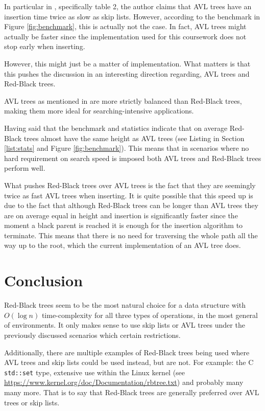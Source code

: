 \documentclass[article]{uom-coursework}
\def\CC{{C\nolinebreak\raisebox{.25ex}{\scriptsize\bfseries{++}}}}
\begin{document}
In particular in \textcite{pugh90}, specifically table 2, the
author claims that AVL trees have an insertion time twice as
slow as skip lists. However, according to the benchmark in
Figure \ref{fig:benchmark}, this is actually not the case. In
fact, AVL trees might actually be faster since the
implementation used for this coursework does not stop early when
inserting.

However, this might just be a matter of implementation. What
matters is that this pushes the discussion in an interesting
direction regarding, AVL trees and Red-Black trees.

AVL trees as mentioned in \textcite{wikiavltree} are
more strictly balanced than Red-Black trees, making
them more ideal for searching-intensive applications.

Having said that the benchmark and statistics indicate that on
average Red-Black trees almost have the same height as AVL trees
(see Listing in Section \ref{list:stats} and Figure
\ref{fig:benchmark}). This means that in scenarios
where no hard requirement on search speed is imposed
both AVL trees and Red-Black trees perform well.

What pushes Red-Black trees over AVL trees is the fact that they
are seemingly twice as fast AVL trees when inserting. It is
quite possible that this speed up is due to the fact that
although Red-Black trees can be longer than AVL trees they are
on average equal in height and insertion is significantly faster
since the moment a black parent is reached it is enough for the
insertion algorithm to terminate. This means that there is no
need for traversing the whole path all the way up to the root,
which the current implementation of an AVL tree does.

\section{Conclusion}

Red-Black trees seem to be the most natural choice for a data
structure with $O(\log n)$ time-complexity for all three types
of operations, in the most general of environments. It only
makes sense to use skip lists or AVL trees under the previously
discussed scenarios which certain restrictions. 

Additionally, there are multiple examples of Red-Black trees
being used where AVL trees and skip lists could be used instead,
but are not. For example: the \CC{} \texttt{std::set} type,
extensive use within the Linux kernel (see
\url{https://www.kernel.org/doc/Documentation/rbtree.txt}) and
probably many many more. That is to say that Red-Black trees are
generally preferred over AVL trees or skip lists.

\printbibliography
\end{document}
